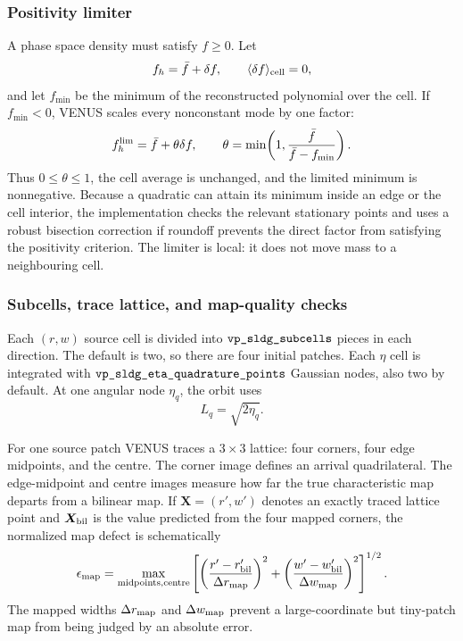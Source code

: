 \subsubsection{Positivity limiter}

A phase space density must satisfy \(f\ge0\).  Let
\[
 f_h=\bar f+\delta f,
\qquad \langle\delta f\rangle_{\rm cell}=0,
\]
and let \(f_{\min}\) be the minimum of the reconstructed polynomial over the
cell.  If \(f_{\min}<0\), VENUS scales every nonconstant mode by one factor:
\[
 f_h^{\rm lim}=\bar f+\theta\delta f,
\qquad
 \theta=\min\!\left(1,
 \frac{\bar f}{\bar f-f_{\min}}\right).
\]
Thus \(0\le\theta\le1\), the cell average is unchanged, and the limited
minimum is nonnegative.  Because a quadratic can attain its minimum inside an
edge or the cell interior, the implementation checks the relevant stationary
points and uses a robust bisection correction if roundoff prevents the direct
factor from satisfying the positivity criterion.  The limiter is local: it does not
move mass to a neighbouring cell.

\subsubsection{Subcells, trace lattice, and map-quality checks}

Each \((r,w)\) source cell is divided into
\(\code{vp_sldg_subcells}\) pieces in each direction.  The default is two,
so there are four initial patches.  Each \(\eta\) cell is integrated with
\(\code{vp_sldg_eta_quadrature_points}\) Gaussian nodes, also two by default.
At one angular node \(\eta_q\), the orbit uses
\[
 L_q=\sqrt{2\eta_q}.
\]

For one source patch VENUS traces a \(3\times3\) lattice: four corners, four
edge midpoints, and the centre.  The corner image defines an arrival
quadrilateral.  The edge-midpoint and centre images measure how far the true
characteristic map departs from a bilinear map.  If
\(\bm X=(r',w')\) denotes an exactly traced lattice point and
\(\bm X_{\rm bil}\) is the value predicted from the four mapped corners, the
normalized map defect is schematically
\[
 \epsilon_{\rm map}
 =\max_{\rm midpoints,centre}
 \left[
 \left(\frac{r'-r'_{\rm bil}}{\Delta r_{\rm map}}\right)^2+
 \left(\frac{w'-w'_{\rm bil}}{\Delta w_{\rm map}}\right)^2
 \right]^{1/2}.
\]
The mapped widths \(\Delta r_{\rm map}\) and \(\Delta w_{\rm map}\) prevent a
large-coordinate but tiny-patch map from being judged by an absolute error.

